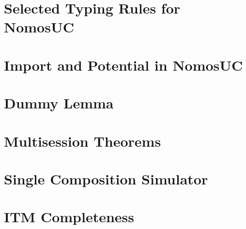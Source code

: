 \documentclass[acmsmall,screen,review,anonymous]{acmart}
\begin{document}
\section{Selected Typing Rules for NomosUC} \label{app:typing_rules}


\section{Import and Potential in NomosUC} \label{sec:import}


%

\section{Dummy Lemma} \label{app:dummy}


\section{Multisession Theorems} \label{app:ms}


\section{Single Composition Simulator} \label{app:simcomp}


%
%
%
%
%

\section{ITM Completeness} \label{app:itm}


\pagebreak
\end{document}

